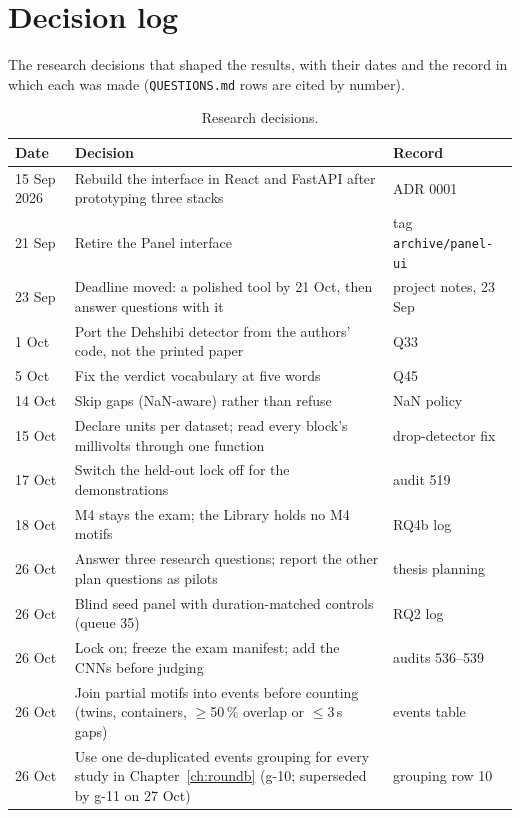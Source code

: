 \chapter{Decision log}
\label{app:decisions}

The research decisions that shaped the results, with their dates and the record in which each was made (\texttt{QUESTIONS.md} rows are cited by number).

\begin{table}[htbp]
\caption[{Research decisions.}]{Research decisions.}
\label{tab:decisions}
\footnotesize
\begin{tabularx}{\textwidth}{p{1.7cm} X p{2.6cm}}
\toprule
\textbf{Date} & \textbf{Decision} & \textbf{Record}\\
\midrule
15 Sep 2026 & Rebuild the interface in React and FastAPI after prototyping three stacks & ADR 0001\\
21 Sep & Retire the Panel interface & tag \texttt{archive/\allowbreak panel-ui}\\
23 Sep & Deadline moved: a polished tool by 21 Oct, then answer questions with it & project notes, 23 Sep\\
1 Oct & Port the Dehshibi detector from the authors' code, not the printed paper & Q33\\
5 Oct & Fix the verdict vocabulary at five words & Q45\\
14 Oct & Skip gaps (NaN-aware) rather than refuse & NaN policy\\
15 Oct & Declare units per dataset; read every block's millivolts through one function & drop-detector fix\\
17 Oct & Switch the held-out lock off for the demonstrations & audit 519\\
18 Oct & M4 stays the exam; the Library holds no M4 motifs & RQ4b log\\
26 Oct & Answer three research questions; report the other plan questions as pilots & thesis planning\\
26 Oct & Blind seed panel with duration-matched controls (queue 35) & RQ2 log\\
26 Oct & Lock on; freeze the exam manifest; add the CNNs before judging & audits 536--539\\
26 Oct & Join partial motifs into events before counting (twins, containers, $\ge$50\,\% overlap or $\le$3\,s gaps) & events table\\
26 Oct & Use one de-duplicated events grouping for every study in Chapter~\ref{ch:roundb} (g-10; superseded by g-11 on 27 Oct) & grouping row 10\\

\end{tabularx}
\end{table}

